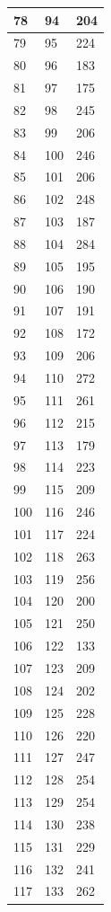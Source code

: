 \begin{tabular}{p{}p{}p{}}
\hline
78 & 94 & 204 \\
\hline
79 & 95 & 224 \\
\hline
80 & 96 & 183 \\
\hline
81 & 97 & 175 \\
\hline
82 & 98 & 245 \\
\hline
83 & 99 & 206 \\
\hline
84 & 100 & 246 \\
\hline
85 & 101 & 206 \\
\hline
86 & 102 & 248 \\
\hline
87 & 103 & 187 \\
\hline
88 & 104 & 284 \\
\hline
89 & 105 & 195 \\
\hline
90 & 106 & 190 \\
\hline
91 & 107 & 191 \\
\hline
92 & 108 & 172 \\
\hline
93 & 109 & 206 \\
\hline
94 & 110 & 272 \\
\hline
95 & 111 & 261 \\
\hline
96 & 112 & 215 \\
\hline
97 & 113 & 179 \\
\hline
98 & 114 & 223 \\
\hline
99 & 115 & 209 \\
\hline
100 & 116 & 246 \\
\hline
101 & 117 & 224 \\
\hline
102 & 118 & 263 \\
\hline
103 & 119 & 256 \\
\hline
104 & 120 & 200 \\
\hline
105 & 121 & 250 \\
\hline
106 & 122 & 133 \\
\hline
107 & 123 & 209 \\
\hline
108 & 124 & 202 \\
\hline
109 & 125 & 228 \\
\hline
110 & 126 & 220 \\
\hline
111 & 127 & 247 \\
\hline
112 & 128 & 254 \\
\hline
113 & 129 & 254 \\
\hline
114 & 130 & 238 \\
\hline
115 & 131 & 229 \\
\hline
116 & 132 & 241 \\
\hline
117 & 133 & 262 \\

\end{tabular}
